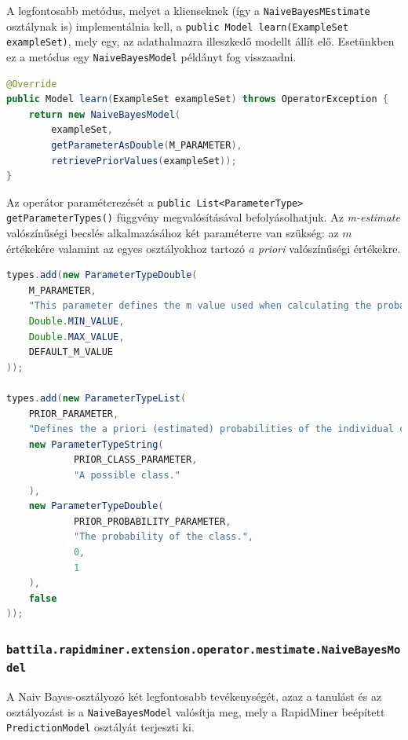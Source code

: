 \documentclass[a4paper]{article}
\begin{document}
A legfontosabb metódus, melyet a klienseknek (így a \texttt{NaiveBayesMEstimate} osztálynak is) implementálnia kell, a \texttt{public Model learn(ExampleSet exampleSet)}, mely egy, az adathalmazra illeszkedő modellt állít elő. Esetünkben ez a metódus egy \texttt{NaiveBayesModel} példányt fog visszaadni.

\begin{lstlisting}[language=Java, caption={A \texttt{learn} metódus implementációja.}, captionpos=b, escapechar=$]
@Override
public Model learn(ExampleSet exampleSet) throws OperatorException {
    return new NaiveBayesModel(
        exampleSet,
        getParameterAsDouble(M_PARAMETER),
        retrievePriorValues(exampleSet));
}
\end{lstlisting}


Az operátor paraméterezését a \texttt{public List<ParameterType> getParameterTypes()} függvény megvalósításával befolyásolhatjuk. Az \textit{m-estimate} valószínűségi becslés alkalmazásához két paraméterre van szükség: az $m$ értékekére valamint az egyes osztályokhoz tartozó \textit{a priori} valószínűségi értékekre.

\begin{lstlisting}[language=Java, caption={A paraméterek definiálása.}, captionpos=b, escapechar=$]
types.add(new ParameterTypeDouble(
    M_PARAMETER,
    "This parameter defines the m value used when calculating the probability.",
    Double.MIN_VALUE,
    Double.MAX_VALUE,
    DEFAULT_M_VALUE
));

types.add(new ParameterTypeList(
    PRIOR_PARAMETER,
    "Defines the a priori (estimated) probabilities of the individual classes.",
    new ParameterTypeString(
            PRIOR_CLASS_PARAMETER,
            "A possible class."
    ),
    new ParameterTypeDouble(
            PRIOR_PROBABILITY_PARAMETER,
            "The probability of the class.",
            0,
            1
    ),
    false
));
\end{lstlisting}

\subsubsection{\texttt{battila.rapidminer.extension.operator.mestimate.NaiveBayesModel}}

A Naiv Bayes-osztályozó két legfontosabb tevékenységét, azaz a tanulást és az osztályozást is a \texttt{NaiveBayesModel} valósítja meg, mely a RapidMiner beépített \texttt{PredictionModel} osztályát terjeszti ki.
\end{document}

